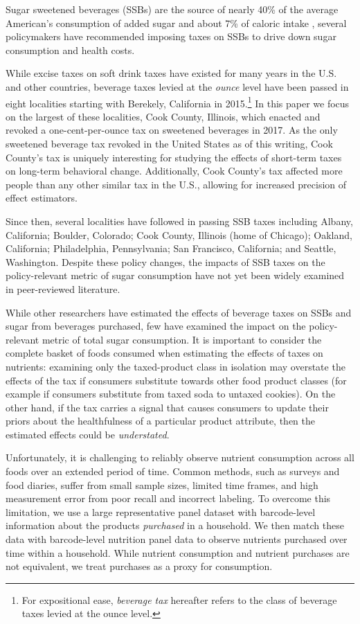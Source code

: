 \documentclass[12pt]{article}
\begin{document}
Sugar sweetened beverages (SSBs) are the source of nearly 40\% of the average American's consumption of added sugar \parencite{dietary2015dietary} and about 7\% of caloric intake \parencite{allcott2019should}, several policymakers have recommended imposing taxes on SSBs to drive down sugar consumption and health costs.

While excise taxes on soft drink taxes have existed for many years in the U.S. and other countries, beverage taxes levied at the \textit{ounce} level have been passed in eight localities starting with Berekely, California in 2015.\footnote{For expositional ease, \textit{beverage tax} hereafter refers to the class of beverage taxes levied at the ounce level.} In this paper we focus on the largest of these localities, Cook County, Illinois, which enacted and revoked a one-cent-per-ounce tax on sweetened beverages in 2017. As the only sweetened beverage tax revoked in the United States as of this writing, Cook County's tax is uniquely interesting for studying the effects of short-term taxes on long-term behavioral change. Additionally, Cook County's tax affected more people than any other similar tax in the U.S., allowing for increased precision of effect estimators.

Since then, several localities have followed in passing SSB taxes including Albany, California; Boulder, Colorado; Cook County, Illinois (home of Chicago); Oakland, California; Philadelphia, Pennsylvania; San Francisco, California; and Seattle, Washington. Despite these policy changes, the impacts of SSB taxes on the policy-relevant metric of sugar consumption have not yet been widely examined in peer-reviewed literature.

While other researchers have estimated the effects of beverage taxes on SSBs and sugar from beverages purchased, few have examined the impact on the policy-relevant metric of total sugar consumption. It is important to consider the complete basket of foods consumed when estimating the effects of taxes on nutrients: examining only the taxed-product class in isolation may overstate the effects of the tax if consumers substitute towards other food product classes (for example if consumers substitute from taxed soda to untaxed cookies). On the other hand, if the tax carries a signal that causes consumers to update their priors about the healthfulness of a particular product attribute, then the estimated effects could be \textit{understated}.

Unfortunately, it is challenging to reliably observe nutrient consumption across all foods over an extended period of time. Common methods, such as surveys and food diaries, suffer from small sample sizes, limited time frames, and high measurement error from poor recall and incorrect labeling. To overcome this limitation, we use a large representative panel dataset with barcode-level information about the products \textit{purchased} in a household. We then match these data with barcode-level nutrition panel data to observe nutrients purchased over time within a household. While nutrient consumption and nutrient purchases are not equivalent, we treat purchases as a proxy for consumption.
\end{document}

